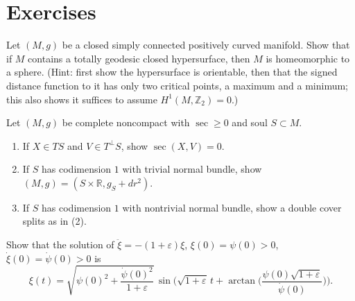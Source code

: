 \section{Exercises}

\begin{remark}
  \label{rem:pet-ch12-ex-12-8-1}

  Let $(M,g)$ be a closed simply connected positively curved manifold. Show
  that if $M$ contains a totally geodesic closed hypersurface, then $M$ is
  homeomorphic to a sphere. (Hint: first show the hypersurface is orientable,
  then that the signed distance function to it has only two critical points, a
  maximum and a minimum; this also shows it suffices to assume
  $H^1(M,\mathbb{Z}_2)=0$.)
\end{remark}

\begin{remark}
  \label{rem:pet-ch12-ex-12-8-2}

  Let $(M,g)$ be complete noncompact with $\sec\ge0$ and soul $S\subset M$.
  \begin{enumerate}
    \item If $X\in TS$ and $V\in T^\perp S$, show $\sec(X,V)=0$.
    \item If $S$ has codimension $1$ with trivial normal bundle, show
      $(M,g)=(S\times\mathbb{R},g_S+dr^2)$.
    \item If $S$ has codimension $1$ with nontrivial normal bundle, show a
      double cover splits as in (2).
  \end{enumerate}
\end{remark}

\begin{remark}
  \label{rem:pet-ch12-ex-12-8-3}

  Show that the solution of $\ddot\xi=-(1+\varepsilon)\xi$,
  $\xi(0)=\psi(0)>0$, $\dot\xi(0)=\dot\psi(0)>0$ is
  \[
    \xi(t)=\sqrt{\psi(0)^2+\frac{\dot\psi(0)^2}{1+\varepsilon}}\,
    \sin\Big(\sqrt{1+\varepsilon}\,t+\arctan\Big(\frac{\psi(0)\sqrt{1+\varepsilon}}{\dot\psi(0)}\Big)\Big).
  \]
\end{remark}


